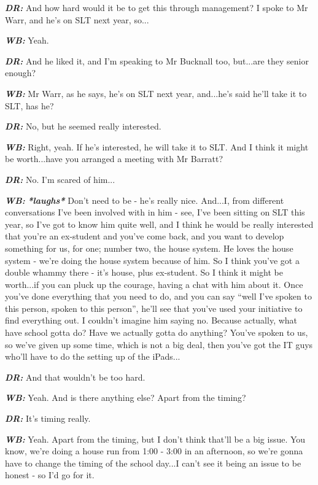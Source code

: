 \textit{\textbf{DR:}} And how hard would it be to get this through management? I spoke to Mr Warr, and he's on SLT next year, so...

\textit{\textbf{WB:}} Yeah.

\textit{\textbf{DR:}} And he liked it, and I'm speaking to Mr Bucknall too, but...are they senior enough?

\textit{\textbf{WB:}} Mr Warr, as he says, he's on SLT next year, and...he's said he'll take it to SLT, has he?

\textit{\textbf{DR:}} No, but he seemed really interested.

\textit{\textbf{WB:}} Right, yeah. If he's interested, he will take it to SLT. And I think it might be worth...have you arranged a meeting with Mr Barratt?

\textit{\textbf{DR:}} No. I'm scared of him...

\textit{\textbf{WB:}} \textit{\textbf{*laughs*}} Don't need to be - he's really nice. And...I, from different conversations I've been involved with in him - see, I've been sitting on SLT this year, so I've got to know him quite well, and I think he would be really interested that you're an ex-student and you've come back, and you want to develop something for us, for one; number two, the house system. He loves the house system - we're doing the house system because of him. So I think you've got a double whammy there - it's house, plus ex-student. So I think it might be worth...if you can pluck up the courage, having a chat with him about it. Once you've done everything that you need to do, and you can say ``well I've spoken to this person, spoken to this person'', he'll see that you've used your initiative to find everything out. I couldn't imagine him saying no. Because actually, what have school gotta do? Have we actually gotta do anything? You've spoken to us, so we've given up some time, which is not a big deal, then you've got the IT guys who'll have to do the setting up of the iPads...

\textit{\textbf{DR:}} And that wouldn't be too hard.

\textit{\textbf{WB:}} Yeah. And is there anything else? Apart from the timing?

\textit{\textbf{DR:}} It's timing really.

\textit{\textbf{WB:}} Yeah. Apart from the timing, but I don't think that'll be a big issue. You know, we're doing a house run from 1:00 - 3:00 in an afternoon, so we're gonna have to change the timing of the school day...I can't see it being an issue to be honest - so I'd go for it.

